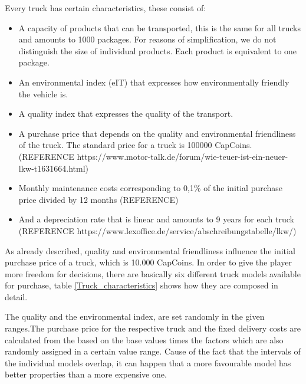 Every truck has certain characteristics, these consist of:
\begin{itemize}
    \item A capacity of products that can be transported, this is the same for all trucks and amounts to 1000 packages. For reasons of simplification, we do not distinguish the size of individual products.  Each product is equivalent to one package. 
    \item An environmental index (eIT) that expresses how environmentally friendly the vehicle is.
    \item A quality index that expresses the quality of the transport.
    \item A purchase price that depends on the quality and environmental friendliness of the truck. The standard price for a truck is 100000 CapCoins. (REFERENCE https://www.motor-talk.de/forum/wie-teuer-ist-ein-neuer-lkw-t1631664.html)
    \item Monthly maintenance costs corresponding to 0,1\% of the initial purchase price divided by 12 months (REFERENCE)
    \item And a depreciation rate that is linear and amounts to 9 years for each truck (REFERENCE https://www.lexoffice.de/service/abschreibungstabelle/lkw/) 
\end{itemize}

As already described, quality and environmental friendliness influence the initial purchase price of a truck, which is 10.000 CapCoins. In order to give the player more freedom for decisions, there are basically six different truck models available for purchase, table \ref{Truck_characteristics} shows how they are composed in detail. 

The quality and the environmental index, are set randomly in the given ranges.The purchase price for the respective truck and the fixed delivery costs are calculated from the based on the base values times the factors which are also randomly assigned in a certain value range. Cause of the fact that the intervals of the individual models overlap, it can happen that a more favourable model has better properties than a more expensive one.


